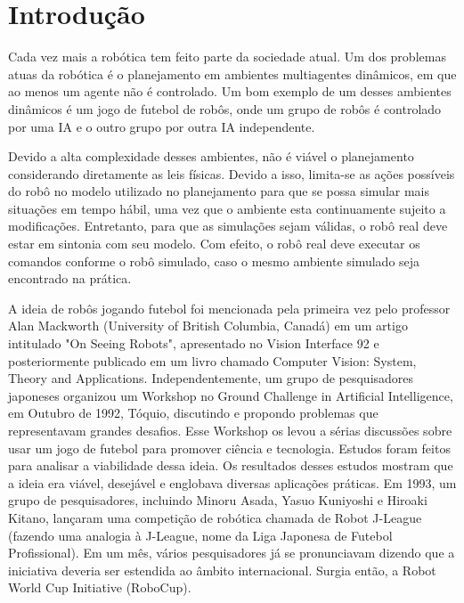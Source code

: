 \chapter{Introdução}

Cada vez mais a robótica tem feito parte da sociedade atual. Um dos problemas
atuas da robótica é o planejamento em ambientes multiagentes dinâmicos, em
que ao menos um agente não é controlado. Um bom exemplo de um desses ambientes
dinâmicos é um jogo de futebol de robôs, onde um grupo de robôs é controlado por
uma IA e o outro grupo por outra IA independente.

Devido a alta complexidade desses ambientes, não é viável o planejamento considerando
diretamente as leis físicas. Devido a isso, limita-se as ações possíveis do robô
no modelo utilizado no planejamento para que se possa simular mais situações em tempo
hábil, uma vez que o ambiente esta continuamente sujeito a modificações. Entretanto,
para que as simulações sejam válidas, o robô real deve estar em sintonia com seu
modelo. Com efeito, o robô real deve executar os comandos conforme o robô simulado,
caso o mesmo ambiente simulado seja encontrado na prática.

A ideia de robôs jogando futebol foi mencionada pela primeira vez pelo professor
Alan Mackworth (University of British Columbia, Canadá) em um artigo intitulado "On
Seeing Robots", apresentado no Vision Interface 92 e posteriormente publicado em um
livro chamado Computer Vision: System, Theory and Applications. Independentemente,
um grupo de pesquisadores japoneses organizou um Workshop no Ground Challenge in
Artificial Intelligence, em Outubro de 1992, Tóquio, discutindo e propondo problemas que
representavam grandes desafios. Esse Workshop os levou a sérias discussões sobre usar
um jogo de futebol para promover ciência e tecnologia. Estudos foram feitos para analisar
a viabilidade dessa ideia. Os resultados desses estudos mostram que a ideia era viável,
desejável e englobava diversas aplicações práticas. Em 1993, um grupo de pesquisadores,
incluindo Minoru Asada, Yasuo Kuniyoshi e Hiroaki Kitano, lançaram uma competição
de robótica chamada de Robot J-League (fazendo uma analogia à J-League, nome da Liga
Japonesa de Futebol Profissional). Em um mês, vários pesquisadores já se pronunciavam
dizendo que a iniciativa deveria ser estendida ao âmbito internacional. Surgia então, a
Robot World Cup Initiative (RoboCup).

